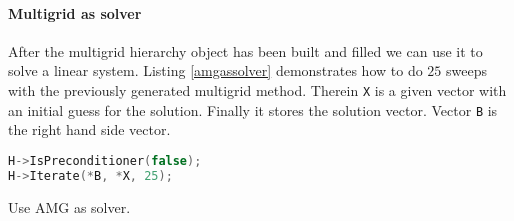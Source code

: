 \paragraph{Multigrid as solver}
After the multigrid hierarchy object has been built and filled we can use it to solve a linear system.
Listing \ref{amgassolver} demonstrates how to do $25$ sweeps with the previously generated multigrid method. Therein \verb|X| is a given vector with an initial guess for the solution. Finally it stores the solution vector. Vector \verb|B| is the right hand side vector.
\begin{Listing} 
\begin{center} 
\begin{lstlisting}[language=C++,label=listing:AmgAsSolver]
H->IsPreconditioner(false);
H->Iterate(*B, *X, 25);
\end{lstlisting}
\caption{Use AMG as solver.} 
\label{listing:amgassolver}
\end{center}
\end{Listing}

